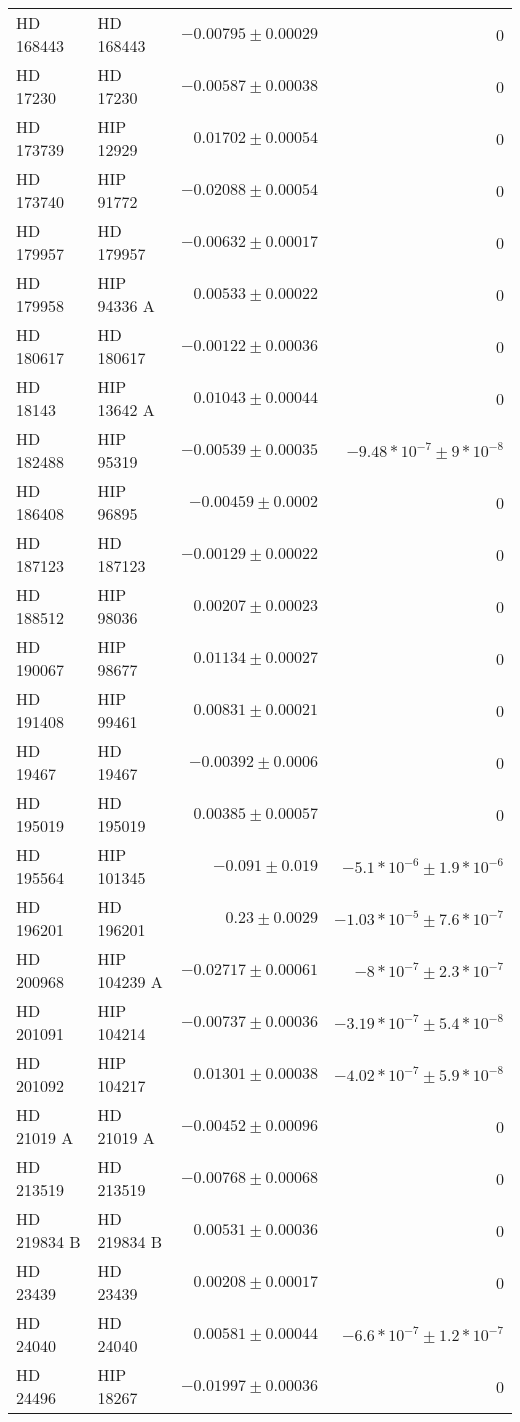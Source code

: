 \begin{longtable*}{llrr}
HD 168443 & HD 168443 & $-0.00795\pm 0.00029$ & 0 \\
HD 17230 & HD 17230 & $-0.00587\pm 0.00038$ & 0 \\
HD 173739 & HIP 12929 & $0.01702\pm 0.00054$ & 0 \\
HD 173740 & HIP 91772 & $-0.02088\pm 0.00054$ & 0 \\
HD 179957 & HD 179957 & $-0.00632\pm 0.00017$ & 0 \\
HD 179958 & HIP 94336 A & $0.00533\pm 0.00022$ & 0 \\
HD 180617 & HD 180617 & $-0.00122\pm 0.00036$ & 0 \\
HD 18143 & HIP 13642 A & $0.01043\pm 0.00044$ & 0 \\
HD 182488 & HIP 95319 & $-0.00539\pm 0.00035$ & $-9.48*10^{-7}\pm 9*10^{-8}$ \\
HD 186408 & HIP 96895 & $-0.00459\pm 0.0002$ & 0 \\
HD 187123 & HD 187123 & $-0.00129\pm 0.00022$ & 0 \\
HD 188512 & HIP 98036 & $0.00207\pm 0.00023$ & 0 \\
HD 190067 & HIP 98677 & $0.01134\pm 0.00027$ & 0 \\
HD 191408 & HIP 99461 & $0.00831\pm 0.00021$ & 0 \\
HD 19467 & HD 19467 & $-0.00392\pm 0.0006$ & 0 \\
HD 195019 & HD 195019 & $0.00385\pm 0.00057$ & 0 \\
HD 195564 & HIP 101345 & $-0.091\pm 0.019$ & $-5.1*10^{-6}\pm 1.9*10^{-6}$ \\
HD 196201 & HD 196201 & $0.23\pm 0.0029$ & $-1.03*10^{-5}\pm 7.6*10^{-7}$ \\
HD 200968 & HIP 104239 A & $-0.02717\pm 0.00061$ & $-8*10^{-7}\pm 2.3*10^{-7}$ \\
HD 201091 & HIP 104214 & $-0.00737\pm 0.00036$ & $-3.19*10^{-7}\pm 5.4*10^{-8}$ \\
HD 201092 & HIP 104217 & $0.01301\pm 0.00038$ & $-4.02*10^{-7}\pm 5.9*10^{-8}$ \\
HD 21019 A & HD 21019 A & $-0.00452\pm 0.00096$ & 0 \\
HD 213519 & HD 213519 & $-0.00768\pm 0.00068$ & 0 \\
HD 219834 B & HD 219834 B & $0.00531\pm 0.00036$ & 0 \\
HD 23439 & HD 23439 & $0.00208\pm 0.00017$ & 0 \\
HD 24040 & HD 24040 & $0.00581\pm 0.00044$ & $-6.6*10^{-7}\pm 1.2*10^{-7}$ \\
HD 24496 & HIP 18267 & $-0.01997\pm 0.00036$ & 0 \\

\end{longtable*}
